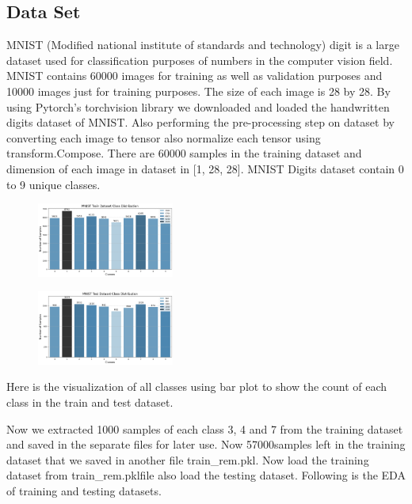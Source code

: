 \documentclass[conference]{IEEEtran}
\begin{document}
\subsection{Data Set}
MNIST (Modified national institute of standards and technology) digit is a large dataset used for classification purposes of numbers in the computer vision field. MNIST contains 60000 images for training as well as validation purposes and 10000 images just for training purposes. The size of each image is 28 by 28.
By using Pytorch’s torchvision library we downloaded and loaded the handwritten digits dataset of MNIST. Also performing the pre-processing step on dataset by converting each image to tensor also normalize each tensor using transform.Compose. There are 60000 samples in the training dataset and dimension of each image in dataset in [1, 28, 28]. MNIST Digits dataset contain 0 to 9 unique classes. 
\begin{figure}[h]
    \centering
    \includegraphics[width=0.4\textwidth, keepaspectratio]{mnist_train.png}
\end{figure}

\begin{figure}[h]
    \centering
    \includegraphics[width=0.4\textwidth, keepaspectratio]{mnist_test.png}
\end{figure}

Here is the visualization of all classes using bar plot to show the count of each class in the train and test dataset.

\vspace{0.5cm}
Now we extracted 1000 samples of each class 3, 4 and 7 from the training dataset and saved in the separate files for later use. Now 57000samples left in the training dataset that we saved in another file train\_rem.pkl. Now load the training dataset from train\_rem.pklfile also load the testing dataset. Following is the EDA of training and testing datasets.
\end{document}

